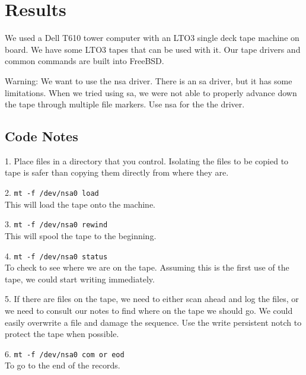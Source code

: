 
\section{Results}

We used a Dell T610 tower computer with an LTO3 single deck tape machine on board.  We have some LTO3 tapes that can be used with it.  Our tape drivers and common commands are built into FreeBSD.

Warning:  We want to use the nsa driver.  There is an sa driver, but it has some limitations.  When we tried using sa, we were not able to properly advance down the tape through multiple file markers.  Use nsa for the the driver.


\subsection{Code Notes}
1.  Place files in a directory that you control.  Isolating the files to be copied to tape is safer than copying them directly from where they are.

2.  \texttt{mt -f /dev/nsa0 load}\\
This will load the tape onto the machine.

3.  \texttt{mt -f /dev/nsa0 rewind}\\
This will spool the tape to the beginning.

4.  \texttt{mt -f /dev/nsa0 status}\\
To check to see where we are on the tape.  Assuming this is the first use of the tape, we could start writing immediately.

5.  If there are files on the tape, we need to either scan ahead and log the files, or we need to consult our notes to find where on the tape we should go.  We could easily overwrite a file and damage the sequence.  Use the write persistent notch to protect the tape when possible.

6.  \texttt{mt -f /dev/nsa0 com or eod}\\
To go to the end of the records.

